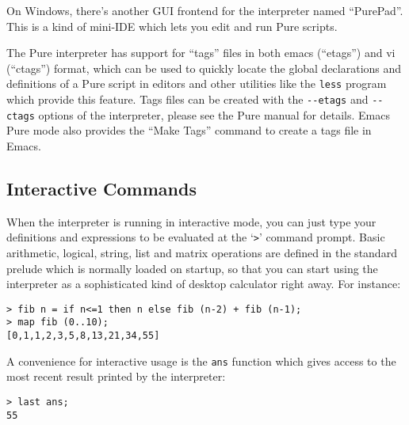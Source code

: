 \documentclass[a4paper,12pt]{article}
\begin{document}
On Windows, there's another GUI frontend for the interpreter named ``PurePad''. This is a kind of mini-IDE which lets you edit and run Pure scripts.

The Pure interpreter has support for ``tags'' files in both emacs (``etags'') and vi (``ctags'') format, which can be used to quickly locate the global declarations and definitions of a Pure script in editors and other utilities like the \verb|less| program which provide this feature. Tags files can be created with the \verb|--etags| and \verb|--ctags| options of the interpreter, please see the Pure manual for details. Emacs Pure mode also provides the ``Make Tags'' command to create a tags file in Emacs.

\subsection{Interactive Commands}
\label{Interactive}

When the interpreter is running in interactive mode, you can just type your definitions and expressions to be evaluated at the `\verb|>|' command prompt. Basic arithmetic, logical, string, list and matrix operations are defined in the standard prelude which is normally loaded on startup, so that you can start using the interpreter as a sophisticated kind of desktop calculator right away. For instance:

\begin{lstlisting}
> fib n = if n<=1 then n else fib (n-2) + fib (n-1);
> map fib (0..10);
[0,1,1,2,3,5,8,13,21,34,55]
\end{lstlisting}

A convenience for interactive usage is the \verb|ans| function which gives access to the most recent result printed by the interpreter:

\begin{lstlisting}
> last ans;
55
\end{lstlisting}
\end{document}
